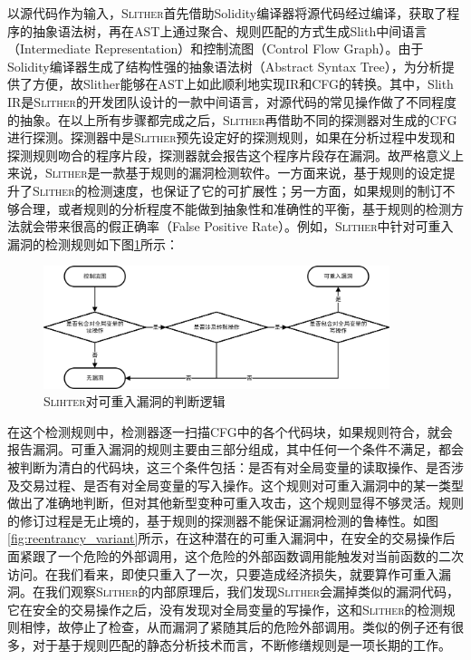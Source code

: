 以源代码作为输入，\textsc{Slither}首先借助Solidity编译器将源代码经过编译，获取了程序的抽象语法树，再在AST上通过聚合、规则匹配的方式生成Slith中间语言（Intermediate Representation）和控制流图（Control Flow Graph）。由于Solidity编译器生成了结构性强的抽象语法树（Abstract Syntax Tree），为分析提供了方便，故Slither能够在AST上如此顺利地实现IR和CFG的转换。其中，Slith IR是\textsc{Slither}的开发团队设计的一款中间语言，对源代码的常见操作做了不同程度的抽象。在以上所有步骤都完成之后，\textsc{Slither}再借助不同的探测器对生成的CFG进行探测。探测器中是\textsc{Slither}预先设定好的探测规则，如果在分析过程中发现和探测规则吻合的程序片段，探测器就会报告这个程序片段存在漏洞。故严格意义上来说，\textsc{Slither}是一款基于规则的漏洞检测软件。一方面来说，基于规则的设定提升了\textsc{Slither}的检测速度，也保证了它的可扩展性；另一方面，如果规则的制订不够合理，或者规则的分析程度不能做到抽象性和准确性的平衡，基于规则的检测方法就会带来很高的假正确率（False Positive Rate）。例如，\textsc{Slither}中针对可重入漏洞的检测规则如下图\ref{fig:slither_reentrancy_flow}所示：

\begin{figure}
\vspace{+2mm}
  \centering
  \includegraphics[width=0.9\textwidth]{figures/slither_reentrancy_flow.png}
  \caption{\textsc{Slihter}对可重入漏洞的判断逻辑}
  \label{fig:slither_reentrancy_flow}
\vspace{-5mm}
\end{figure}

在这个检测规则中，检测器逐一扫描CFG中的各个代码块，如果规则符合，就会报告漏洞。可重入漏洞的规则主要由三部分组成，其中任何一个条件不满足，都会被判断为清白的代码块，这三个条件包括：是否有对全局变量的读取操作、是否涉及交易过程、是否有对全局变量的写入操作。这个规则对可重入漏洞中的某一类型做出了准确地判断，但对其他新型变种可重入攻击，这个规则显得不够灵活。规则的修订过程是无止境的，基于规则的探测器不能保证漏洞检测的鲁棒性。如图\ref{fig:reentrancy_variant}所示，在这种潜在的可重入漏洞中，在安全的交易操作后面紧跟了一个危险的外部调用，这个危险的外部函数调用能触发对当前函数的二次访问。在我们看来，即使只重入了一次，只要造成经济损失，就要算作可重入漏洞。在我们观察\textsc{Slither}的内部原理后，我们发现\textsc{Slither}会漏掉类似的漏洞代码，它在安全的交易操作之后，没有发现对全局变量的写操作，这和\textsc{Slither}的检测规则相悖，故停止了检查，从而漏洞了紧随其后的危险外部调用。类似的例子还有很多，对于基于规则匹配的静态分析技术而言，不断修缮规则是一项长期的工作。

